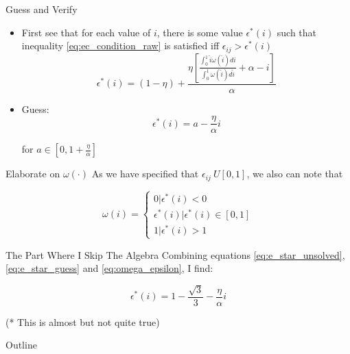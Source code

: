 \documentclass{beamer}
\begin{document}
\begin{frame}{Guess and Verify}
\begin{itemize}
\item First see that for each value of $i$, there is some value $\epsilon^* (i)$ such that inequality \ref{eq:ec_condition_raw} is satisfied iff $\epsilon_{ij} > \epsilon^* (i)$ 
\begin{equation} \label{eq:e_star_unsolved}
\epsilon^*(i) = (1-\eta) + \frac{   \eta \left[ \frac{\int_0^1 \hat{i} \omega(\hat{i}) di}{\int_0^1  \omega(\hat{i}) d\hat{i}} + \alpha -i \right] }{\alpha} 
\end{equation}

\item Guess:
 \begin{equation} \label{eq:e_star_guess}
\epsilon^*(i) = a-\frac{\eta }{\alpha}i
\end{equation} 


for  $a \in [0,1+\frac{\eta }{\alpha}]$
\end{itemize}
\end{frame}

\begin{frame}{Elaborate on $\omega(\cdot)$}
	As we have specified that $\epsilon_{ij} ~ U[0,1]$, we also can note that 
	
	\begin{equation} \label{eq:omega_epsilon}
	\omega(i) =
	\begin{cases}
	0 |  \epsilon^* (i) < 0 \\
	\epsilon^* (i) | \epsilon^* (i) \in [0,1] \\
	1 |  \epsilon^* (i) > 1
	\end{cases}
	\end{equation}
	
	
	
\end{frame}

\begin{frame}{The Part Where I Skip The Algebra}
Combining equations \ref{eq:e_star_unsolved}, \ref{eq:e_star_guess} and \ref{eq:omega_epsilon}, I find:

\begin{equation} \label{eq:big_reveal}
\epsilon^*(i) = 1 - \frac{\sqrt{3}}{3} - \frac{\eta}{\alpha} i
\end{equation}

(* This is almost but not quite true)
\end{frame}

\begin{frame}{Outline}
	\tableofcontents
\end{frame}
\end{document}
